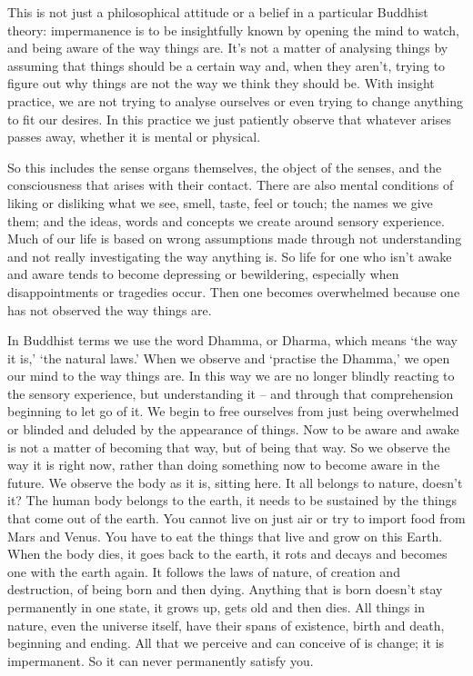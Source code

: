 This is not just a philosophical attitude or a belief in a particular Buddhist theory: impermanence is to be insightfully known by opening the mind to watch, and being aware of the way things are. It's not a matter of analysing things by assuming that things should be a certain way and, when they aren't, trying to figure out why things are not the way we think they should be. With insight practice, we are not trying to analyse ourselves or even trying to change anything to fit our desires. In this practice we just patiently observe that whatever arises passes away, whether it is mental or physical.

So this includes the sense organs themselves, the object of the senses, and the consciousness that arises with their contact. There are also mental conditions of liking or disliking what we see, smell, taste, feel or touch; the names we give them; and the ideas, words and concepts we create around sensory experience. Much of our life is based on wrong assumptions made through not understanding and not really investigating the way anything is. So life for one who isn't awake and aware tends to become depressing or bewildering, especially when disappointments or tragedies occur. Then one becomes overwhelmed because one has not observed the way things are.

In Buddhist terms we use the word Dhamma, or Dharma, which means `the way it is,' `the natural laws.' When we observe and `practise the Dhamma,' we open our mind to the way things are. In this way we are no longer blindly reacting to the sensory experience, but understanding it -- and through that comprehension beginning to let go of it. We begin to free ourselves from just being overwhelmed or blinded and deluded by the appearance of things. Now to be aware and awake is not a matter of becoming that way, but of being that way. So we observe the way it is right now, rather than doing something now to become aware in the future. We observe the body as it is, sitting here. It all belongs to nature, doesn't it? The human body belongs to the earth, it needs to be sustained by the things that come out of the earth. You cannot live on just air or try to import food from Mars and Venus. You have to eat the things that live and grow on this Earth. When the body dies, it goes back to the earth, it rots and decays and becomes one with the earth again. It follows the laws of nature, of creation and destruction, of being born and then dying. Anything that is born doesn't stay permanently in one state, it grows up, gets old and then dies. All things in nature, even the universe itself, have their spans of existence, birth and death, beginning and ending. All that we perceive and can conceive of is change; it is impermanent. So it can never permanently satisfy you.

